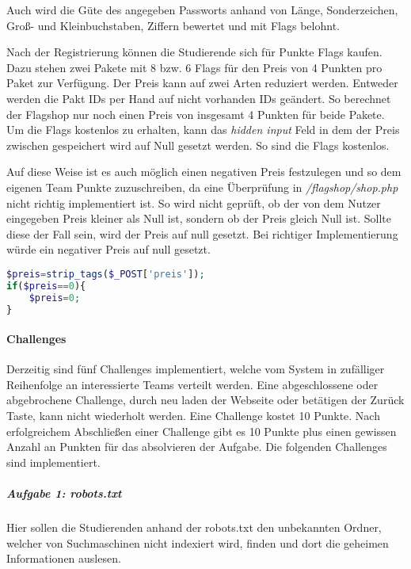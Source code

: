 Auch wird die Güte des angegeben Passworts anhand von Länge, Sonderzeichen, Groß- und Kleinbuchstaben, Ziffern bewertet und mit Flags belohnt.

Nach der Registrierung können die Studierende sich für Punkte Flags kaufen. Dazu stehen zwei Pakete mit 8 bzw. 6 Flags für den Preis von 4 Punkten pro Paket zur Verfügung. Der Preis kann auf zwei Arten reduziert werden. Entweder werden die Pakt IDs per Hand auf nicht vorhanden IDs geändert. So berechnet der Flagshop nur noch einen Preis von insgesamt 4 Punkten für beide Pakete. Um die Flags kostenlos zu erhalten, kann das \textit{hidden input} Feld in dem der Preis zwischen gespeichert wird auf Null gesetzt werden. So sind die Flags kostenlos. \cite[S. 63]{abtsUeberarbeitungUndErweiterung2016}

Auf diese Weise ist es auch möglich einen negativen Preis festzulegen und so dem eigenen Team Punkte zuzuschreiben, da eine Überprüfung in \textit{/flagshop/shop.php} nicht richtig implementiert ist. So wird nicht geprüft, ob der von dem Nutzer eingegeben Preis kleiner als Null ist, sondern ob der Preis gleich Null ist. Sollte diese der Fall sein, wird der Preis auf null gesetzt. Bei richtiger Implementierung würde ein negativer Preis auf null gesetzt.

\begin{lstlisting}[language=PHP,caption={Aktuelle Prüfung des Preises},captionpos=b]
$preis=strip_tags($_POST['preis']);
if($preis==0){
	$preis=0;
}
\end{lstlisting}

\paragraph{Challenges} \label{para:Challenges}
Derzeitig sind fünf Challenges implementiert, welche vom System in zufälliger Reihenfolge an interessierte Teams verteilt werden. Eine abgeschlossene oder abgebrochene Challenge, durch neu laden der Webseite oder betätigen der Zurück Taste, kann nicht wiederholt werden. Eine Challenge kostet 10 Punkte. Nach erfolgreichem Abschließen einer Challenge gibt es 10 Punkte plus einen gewissen Anzahl an Punkten für das absolvieren der Aufgabe. Die folgenden Challenges sind implementiert\cite[S.19-20]{abtsUeberarbeitungUndErweiterung2016}.

\subparagraph{Aufgabe 1: robots.txt}\label{subpara:Aufgabe_1_robots.txt}
Hier sollen die Studierenden anhand der robots.txt den unbekannten Ordner, welcher von Suchmaschinen nicht indexiert wird, finden und dort die geheimen Informationen auslesen.

